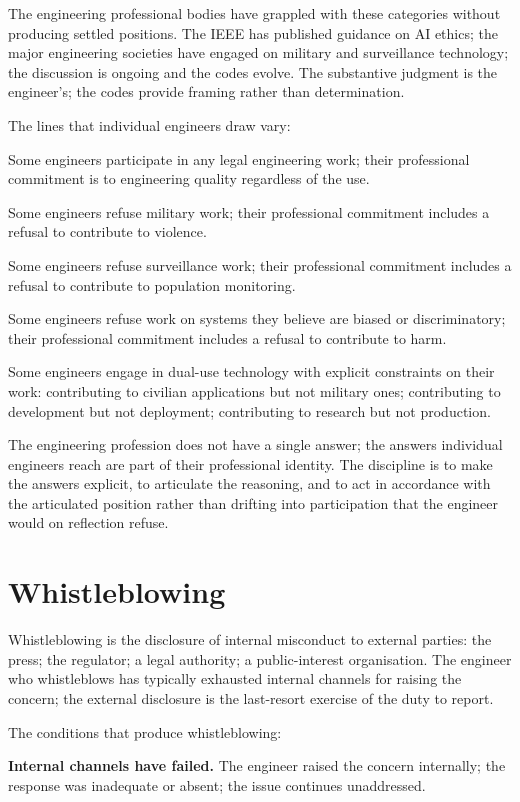 The engineering professional bodies have grappled with these categories without producing settled positions. The IEEE has published guidance on AI ethics; the major engineering societies have engaged on military and surveillance technology; the discussion is ongoing and the codes evolve. The substantive judgment is the engineer's; the codes provide framing rather than determination.

The lines that individual engineers draw vary:

Some engineers participate in any legal engineering work; their professional commitment is to engineering quality regardless of the use.

Some engineers refuse military work; their professional commitment includes a refusal to contribute to violence.

Some engineers refuse surveillance work; their professional commitment includes a refusal to contribute to population monitoring.

Some engineers refuse work on systems they believe are biased or discriminatory; their professional commitment includes a refusal to contribute to harm.

Some engineers engage in dual-use technology with explicit constraints on their work: contributing to civilian applications but not military ones; contributing to development but not deployment; contributing to research but not production.

The engineering profession does not have a single answer; the answers individual engineers reach are part of their professional identity. The discipline is to make the answers explicit, to articulate the reasoning, and to act in accordance with the articulated position rather than drifting into participation that the engineer would on reflection refuse.

\section{Whistleblowing}

Whistleblowing is the disclosure of internal misconduct to external parties: the press; the regulator; a legal authority; a public-interest organisation. The engineer who whistleblows has typically exhausted internal channels for raising the concern; the external disclosure is the last-resort exercise of the duty to report.

The conditions that produce whistleblowing:

\textbf{Internal channels have failed.} The engineer raised the concern internally; the response was inadequate or absent; the issue continues unaddressed.

